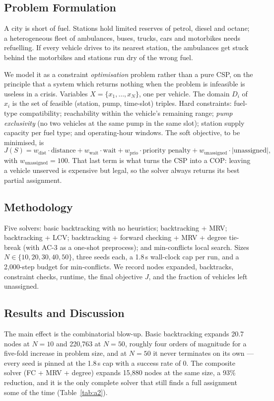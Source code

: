 \documentclass{ai-lab-report}
\begin{document}
\subsection{Problem Formulation}
A city is short of fuel. Stations hold limited reserves of petrol, diesel and octane; a
heterogeneous fleet of ambulances, buses, trucks, cars and motorbikes needs refuelling. If
every vehicle drives to its nearest station, the ambulances get stuck behind the motorbikes
and stations run dry of the wrong fuel.

We model it as a constraint \emph{optimisation} problem rather than a pure CSP, on the
principle that a system which returns nothing when the problem is infeasible is useless in a
crisis. Variables $X = \{x_1, \dots, x_N\}$, one per vehicle. The domain $D_i$ of $x_i$ is the
set of feasible (station, pump, time-slot) triples. Hard constraints: fuel-type compatibility;
reachability within the vehicle's remaining range; \emph{pump exclusivity} (no two vehicles at
the same pump in the same slot); station supply capacity per fuel type; and operating-hour
windows. The soft objective, to be minimised, is
\begin{equation}
J(S) = w_{\text{dist}} \cdot \text{distance} + w_{\text{wait}} \cdot \text{wait}
     + w_{\text{prio}} \cdot \text{priority penalty}
     + w_{\text{unassigned}} \cdot |\text{unassigned}|,
\end{equation}
with $w_{\text{unassigned}} = 100$. That last term is what turns the CSP into a COP: leaving
a vehicle unserved is expensive but legal, so the solver always returns its best partial
assignment.

\subsection{Methodology}
Five solvers: basic backtracking with no heuristics; backtracking + MRV; backtracking + LCV;
backtracking + forward checking + MRV + degree tie-break (with AC-3 as a one-shot preprocess);
and min-conflicts local search. Sizes $N \in \{10,20,30,40,50\}$, three seeds each, a 1.8\,s
wall-clock cap per run, and a 2{,}000-step budget for min-conflicts. We record nodes expanded,
backtracks, constraint checks, runtime, the final objective $J$, and the fraction of vehicles
left unassigned.

\subsection{Results and Discussion}
The main effect is the combinatorial blow-up. Basic backtracking expands
20.7 nodes at $N=10$ and 220{,}763 at $N=50$, roughly four orders of magnitude for a
five-fold increase in problem size, and at $N=50$ it never terminates on its own --- every
seed is pinned at the 1.8\,s cap with a success rate of 0. The composite solver
(FC + MRV + degree) expands 15{,}880 nodes at the same size, a 93\% reduction, and it is the
only complete solver that still finds a full assignment some of the time
(Table~\ref{tab:a2}).
\end{document}
